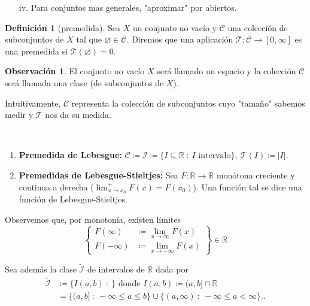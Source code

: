 \documentclass[11pt]{article}
\theoremstyle{definition} %
\newtheorem{definition}[theorem]{Definición}
\newtheorem{remark}[theorem]{Observación}
\newcommand{\R}{\mathbb{R}}
\begin{document}
\begin{property}
\begin{enumerate}
		\item[iv.] Para conjuntos mas generales, "aproximar" por abiertos. 
	\end{enumerate}

	\begin{definition}[premedida]
		Sea $X$ un conjunto no vacío y $\mathscr{C}$ una colección de subconjuntos de $X$ tal que $\varnothing \in \mathscr{C}$. Diremos que una aplicación $\mathcal{T} : \mathscr{C} \to [0,\infty]$ es una premedida si $\mathcal{T} (\varnothing)=0$.
	\end{definition}

	\begin{remark}
		El conjunto no vacío $X$ será llamado un espacio y la colección $\mathscr{C}$ será llamada una clase (de subconjuntos de $X$).
	\end{remark}

	\noindent Intuitivamente, $\mathscr{C}$ representa la colección de subconjuntos cuyo "tamaño" sabemos medir y $\mathcal{T}$ nos da su medida.

	\begin{eg}~
		\begin{enumerate}
			\item \textbf{Premedida de Lebesgue:} $\mathscr{C} \coloneq \mathcal{I} \coloneq \{ I \subseteq \R \ : \ I \text{ intervalo}\}, \ \mathcal{T}(I) \coloneq |I|$.

			\item \textbf{Premedidas de Lebesgue-Stieltjes:} Sea $F:\R \to \R$ monótona creciente y continua a derecha ($\lim_{x \to x_0}^{+} F(x) = F(x_0)$). Una función tal se dice una función de Lebesgue-Stieltjes. 
		\end{enumerate}
	\end{eg}

	\noindent Observemos que, por monotonía, existen límites \[ \left\{ \begin{aligned}
		F(\infty) & \coloneq \lim_{x \to \infty} F(x) \\ 
		F(-\infty) & \coloneq \lim_{x \to -\infty} F(x) 
	\end{aligned} \right\} \in \R \]

	\noindent Sea además la clase $\widetilde{\mathcal{I}}$ de intervalos de $\R$ dada por
	\begin{align*}
		\widetilde{\mathcal{I}} & \coloneq \{ I(a,b) \ : \ \} \text{ donde } I(a,b) \coloneq (a,b] \cap \R \\
		& = \{ (a,b] \ : \ -\infty \leq a \leq b \} \cup \{ (a,\infty) \ : \ -\infty \leq a < \infty \}. 
	.\end{align*}


\end{property}
\end{document}
